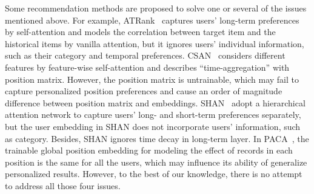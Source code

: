 \documentclass[preprint,12pt]{elsarticle}
\begin{document}
\begin{sloppypar}
Some recommendation methods are proposed to solve one or several of the issues mentioned above. For example, ATRank~\cite{zhou2018atrank} captures users' long-term preferences by self-attention and models the correlation between target item and the historical items by vanilla attention, but it ignores users' individual information, such as their category and temporal preferences. CSAN~\cite{huang2018csan} considers different features by feature-wise self-attention and describes ``time-aggregation'' with position matrix. However, the position matrix is untrainable, which may fail to capture personalized position preferences and cause an order of magnitude difference between position matrix and embeddings. SHAN~\cite{ying2018sequential} adopt a hierarchical attention network to capture users' long- and short-term preferences separately, but the user embedding in SHAN does not incorporate users' information, such as category. Besides, SHAN ignores time decay in long-term layer. In PACA~\cite{cao2020position}, the trainable global position embedding for modeling the effect of records in each position is the same for all the users, which may influence its ability of generalize personalized results. However, to the best of our knowledge, there is no attempt to address all those four issues.


\end{sloppypar}
\end{document}
